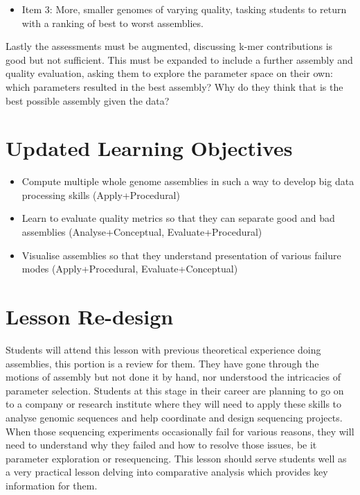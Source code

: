 \documentclass[paper=a4,justified,a4paper]{tufte-handout}
\providecommand{\tightlist}{%
  \setlength{\itemsep}{0pt}\setlength{\parskip}{0pt}}
\begin{document}
\begin{itemize}
\tightlist
\item
  Item 3: More, smaller genomes of varying quality, tasking students to
  return with a ranking of best to worst assemblies.
\end{itemize}

Lastly the assessments must be augmented, discussing k-mer contributions
is good but not sufficient. This must be expanded to include a further
assembly and quality evaluation, asking them to explore the parameter
space on their own: which parameters resulted in the best assembly? Why
do they think that is the best possible assembly given the data?

\hypertarget{updated-learning-objectives}{%
\section{Updated Learning
Objectives}\label{updated-learning-objectives}}

\begin{itemize}
\tightlist
\item
  Compute multiple whole genome assemblies in such a way to develop big
  data processing skills (Apply+Procedural)
\item
  Learn to evaluate quality metrics so that they can separate good and
  bad assemblies (Analyse+Conceptual, Evaluate+Procedural)
\item
  Visualise assemblies so that they understand presentation of various
  failure modes (Apply+Procedural, Evaluate+Conceptual)
\end{itemize}

\hypertarget{lesson-re-design}{%
\section{Lesson Re-design}\label{lesson-re-design}}

Students will attend this lesson with previous theoretical experience
doing assemblies, this portion is a review for them. They have gone
through the motions of assembly but not done it by hand, nor understood
the intricacies of parameter selection. Students at this stage in their
career are planning to go on to a company or research institute where
they will need to apply these skills to analyse genomic sequences and
help coordinate and design sequencing projects. When those sequencing
experiments occasionally fail for various reasons, they will need to
understand why they failed and how to resolve those issues, be it
parameter exploration or resequencing. This lesson should serve students
well as a very practical lesson delving into comparative analysis which
provides key information for them.
\end{document}
